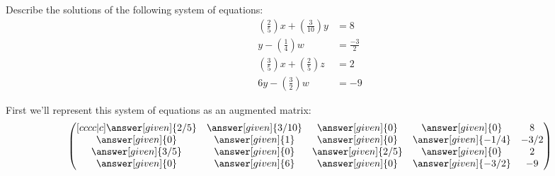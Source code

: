 \documentclass{ximera}
\begin{document}
\begin{example}
  Describe the solutions of the following system of equations:
\begin{align*}
\left(\frac{2}{5}\right)x + \left(\frac{3}{10}\right) y &= 8\\
y -\left(\frac{1}{4}\right)w &= \frac{-3}{2}\\
\left(\frac{3}{5}\right)x + \left(\frac{2}{5}\right)z &= 2\\
6y - \left(\frac{3}{2}\right)w &= -9
\end{align*}
\begin{explanation}
First we'll represent this system of equations as an augmented matrix:
\[
  \begin{pmatrix}[cccc|c]
    \answer[given]{2/5}&  \answer[given]{3/10} & \answer[given]{0} &\answer[given]{0} &8 \\
    \answer[given]{0}&  \answer[given]{1} & \answer[given]{0} &\answer[given]{-1/4} & -3/2\\
    \answer[given]{3/5}&  \answer[given]{0} & \answer[given]{2/5} &\answer[given]{0} &2\\
    \answer[given]{0}&  \answer[given]{6} & \answer[given]{0} &\answer[given]{-3/2} &-9
  \end{pmatrix}
\]


\end{explanation}
\end{example}
\end{document}

